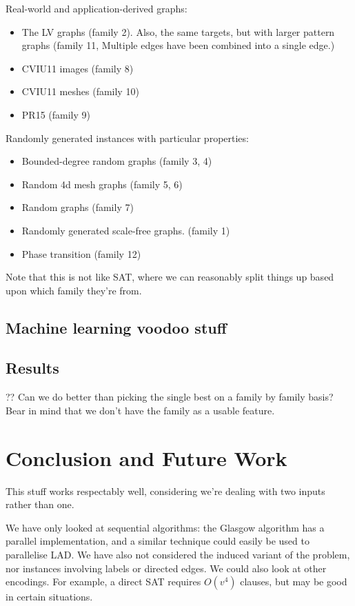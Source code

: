 \documentclass{llncs}
\begin{document}
Real-world and application-derived graphs:

\begin{itemize}
    \item The LV graphs (family 2). Also, the same targets, but with larger pattern graphs (family
        11, Multiple edges have been combined into a single edge.)
    \item CVIU11 images (family 8)
    \item CVIU11 meshes (family 10)
    \item PR15 (family 9)
\end{itemize}

\noindent Randomly generated instances with particular properties:

\begin{itemize}
    \item Bounded-degree random graphs (family 3, 4) \cite{GraphDatabase}
    \item Random 4d mesh graphs (family 5, 6) \cite{GraphDatabase}
    \item Random graphs (family 7) \cite{GraphDatabase}
    \item Randomly generated scale-free graphs. (family 1) \cite{Solnon:2010}
    \item Phase transition (family 12)
\end{itemize}

\noindent Note that this is not like SAT, where we can reasonably split things up based upon which
family they're from.

\subsection{Machine learning voodoo stuff}

\subsection{Results}

?? Can we do better than picking the single best on a family by family basis? Bear in mind that we
don't have the family as a usable feature.

\section{Conclusion and Future Work}

This stuff works respectably well, considering we're dealing with two inputs rather than one.

We have only looked at sequential algorithms: the Glasgow algorithm has a parallel implementation,
and a similar technique could easily be used to parallelise LAD.  We have also not considered the
induced variant of the problem, nor instances involving labels or directed edges.  We could also
look at other encodings. For example, a direct SAT requires $O(v^4)$ clauses, but may be good in
certain situations.



\end{document}
